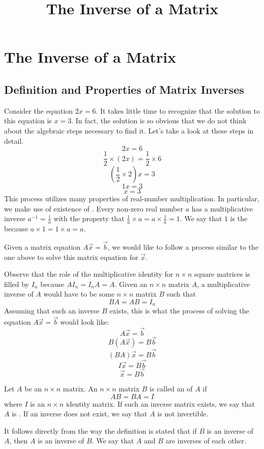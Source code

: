\documentclass{ximera}
\title{The Inverse of a Matrix} \license{CC BY-NC-SA 4.0}
\begin{document}
\begin{abstract}
 
\end{abstract}
\maketitle
\section*{The Inverse of a Matrix}
\subsection*{Definition and Properties of Matrix Inverses}
Consider the equation $2x=6$.  It takes little time to recognize that the solution to this equation is $x=3$.  In fact, the solution is so obvious that we do not think about the algebraic steps necessary to find it.  Let's take a look at these steps in detail.
$$2x=6$$
$$\frac{1}{2}\times (2x)=\frac{1}{2}\times 6$$
$$(\frac{1}{2}\times 2)x=3$$
$$1x=3$$
$$x=3$$
This process utilizes many properties of real-number multiplication.  In particular, we make use of existence of .  Every non-zero real number $a$  has a multiplicative inverse $a^{-1}=\frac{1}{a}$ with the property that $\frac{1}{a}\times a=a\times \frac{1}{a}=1$.  We say that $1$ is the  because $a\times 1=1\times a=a$.

Given a matrix equation $A\vec{x}=\vec{b}$, we would like to follow a process similar to the one above to solve this matrix equation for $\vec{x}$.  

Observe that the role of the multiplicative identity for $n\times n$ square matrices is filled by $I_n$ because $AI_n=I_nA=A$. Given an $n\times n$ matrix $A$, a multiplicative inverse of $A$ would have to be some $n\times n$ matrix $B$ such that
$$BA=AB=I_n$$
Assuming that such an inverse $B$ exists, this is what the process of solving the equation $A\vec{x}=\vec{b}$ would look like:
$$A\vec{x}=\vec{b}$$
$$B(A\vec{x})=B\vec{b}$$
$$(BA)\vec{x}=B\vec{b}$$
$$I\vec{x}=B\vec{b}$$
$$\vec{x}=B\vec{b}$$

\begin{definition}\label{def:matinverse}
Let $A$ be an $n\times n$ matrix.  An $n\times n$ matrix $B$ is called an  of $A$ if 
$$AB=BA=I$$
where $I$ is an $n\times n$ identity matrix.  If such an inverse matrix exists, we say that $A$ is .  If an inverse does not exist, we say that $A$ is not invertible.
\end{definition}
It follows directly from the way the definition is stated that if $B$ is an inverse of $A$, then $A$ is an inverse of $B$. We say that $A$ and $B$ are inverses of each other.
\end{document}

